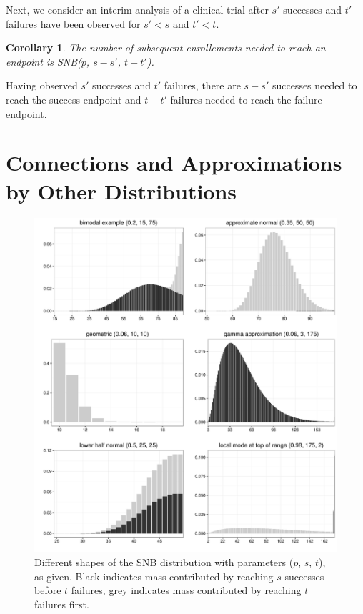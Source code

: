 \documentclass[review]{elsarticle}
\newtheorem{corollary}{Corollary}
\begin{document}
Next, we consider an interim analysis of a clinical trial after $s'$ 
successes and $t'$ failures have been observed for $s' < s$ and $t' < t$.
\begin{corollary} \label{conditional_distribution}
The number of subsequent enrollements needed 
to reach an endpoint is SNB($p$, $s-s'$, $t-t'$).
\end{corollary}
Having observed $s'$
successes and $t'$ failures, there are $s-s'$ successes needed to reach the
success endpoint and $t-t'$ failures needed to reach the failure endpoint.

\section{Connections and Approximations by Other Distributions}

\begin{figure}[p!]
\begin{center}
\includegraphics[width=\textwidth]{shapes.pdf}
\end{center}
\caption{Different shapes of the SNB distribution with parameters 
($p$, $s$, $t$), as given. Black indicates mass contributed by reaching
$s$ successes before $t$ failures, grey indicates
mass contributed by reaching $t$ failures first. \label{shapes.fig}}
\end{figure}
\end{document}
